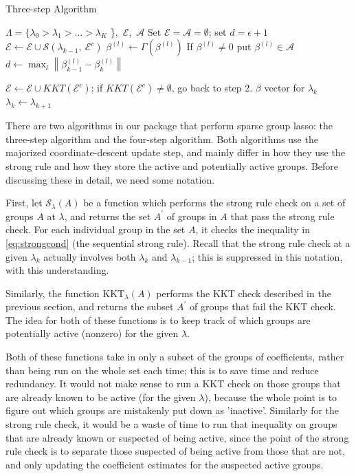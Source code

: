 \documentclass[12pt]{article}
\newcommand{\norm}[1]{\left\lVert #1 \right\rVert}
\begin{document}
\begin{algorithm}[tb!]
  \caption{Three-step Algorithm\label{alg:threeStep}}
  \begin{algorithmic}
     $\Lambda = \{\lambda_0>\lambda_1> \dots > \lambda_K$ \},\ $\mathcal{E}$,\ $\mathcal{A}$
    \STATE Set $\mathcal{E}=\mathcal{A}=\emptyset$; set $d=\epsilon+1$
     $\mathcal{E} \leftarrow  \mathcal{E}\cup \mathcal{S}(\lambda_{k-1},\ \mathcal{E}^c)$
    \STATE  $\beta^{(l)} \leftarrow \Gamma (\beta^{(l)})$
    \STATE If $\beta^{(l)} \neq 0$ put $\beta^{(l)} \in \mathcal{A}$	
	\ENDFOR
	\STATE $d \leftarrow \max_{l} \norm{\beta^{(l)}_{k-1}-\beta^{(l)}_{k}}$ 
	\ENDWHILE    
    
     $\mathcal{E} \leftarrow  \mathcal{E}\cup KKT(\mathcal{E}^c)$; if $KKT(\mathcal{E}^c) \neq \emptyset$, go back to step 2.  
    \RETURN $\beta$ vector for $\lambda_k$
    \STATE $\lambda_k \leftarrow \lambda_{k+1}$
  \end{algorithmic}
\end{algorithm}


There are two algorithms in our package that perform sparse group lasso: the three-step algorithm and the four-step algorithm. Both algorithms use the majorized coordinate-descent update step, and mainly differ in how they use the strong rule and how they store the active and potentially active groups. Before discussing these in detail, we need some notation.

First, let $\mathcal{S}_{\lambda}(A)$ be a function which performs the strong rule check on a set of groups $A$ at $\lambda$, and returns the set $A^{\prime}$ of groups in $A$ that pass the strong rule check. For each individual group in the set $A$, it checks the inequality in \autoref{eq:strongcond} (the sequential strong rule). Recall that the strong rule check at a given $\lambda_k$ actually involves both $\lambda_{k}$ and $\lambda_{k-1}$; this is suppressed in this notation, with this understanding.

Similarly, the function $\textrm{KKT}_{\lambda} (A)$ performs the KKT check described in the previous section, and returns the subset $A^{\prime}$ of groups that fail the KKT check. The idea for both of these functions is to keep track of which groups are potentially active (nonzero) for the given $\lambda$. 

Both of these functions take in only a subset of the groups of coefficients, rather than being run on the whole set each time; this is to save time and reduce redundancy. It would not make sense to run a KKT check on those groups that are already known to be active (for the given $\lambda$), because the whole point is to figure out which groups are mistakenly put down as 'inactive'. Similarly for the strong rule check, it would be a waste of time to run that inequality on groups that are already known or suspected of being active, since the point of the strong rule check is to separate those suspected of being active from those that are not, and only updating the coefficient estimates for the suspected active groups.
\end{document}
